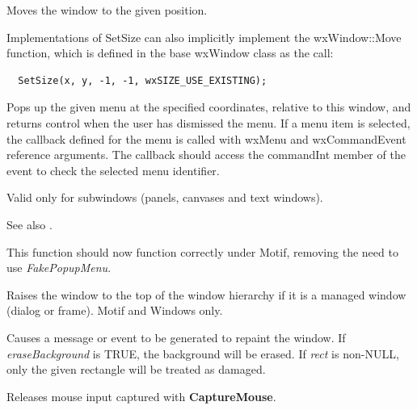 
Moves the window to the given position.

Implementations of SetSize can also implicitly implement the
wxWindow::Move function, which is defined in the base wxWindow class
as the call:

\begin{verbatim}
  SetSize(x, y, -1, -1, wxSIZE_USE_EXISTING);
\end{verbatim}

\label{popupmenu}


Pops up the given menu at the specified coordinates, relative to this
window, and returns control when the user has dismissed the menu. If a
menu item is selected, the callback defined for the menu is called with
wxMenu and wxCommandEvent reference arguments. The callback should access
the commandInt member of the event to check the selected menu identifier.

Valid only for subwindows (panels, canvases and text windows).

See also .

This function should now function correctly under Motif, removing the
need to use {\it FakePopupMenu}.



Raises the window to the top of the window hierarchy if it is a managed window (dialog
or frame). Motif and Windows only.



Causes a message or event to be generated to repaint the
window. If {\it eraseBackground} is TRUE, the background will be
erased. If {\it rect} is non-NULL, only the given rectangle will
be treated as damaged.



Releases mouse input captured with {\bf CaptureMouse}.


